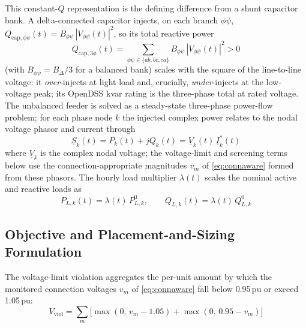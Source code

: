 \documentclass{ieeeaccess}
\newcommand{\SI}[2]{#1\,\ensuremath{\mathrm{#2}}}
\newcommand{\Vviol}{V_{\mathrm{viol}}}
\begin{document}
This constant-$Q$ representation is the defining difference from a shunt
capacitor bank. A delta-connected capacitor injects, on each branch $\phi\psi$,
$Q_{\mathrm{cap},\phi\psi}(t)=B_{\phi\psi}\,|V_{\phi\psi}(t)|^2$, so its total
reactive power
\begin{equation}
Q_{\mathrm{cap},3\phi}(t) = \!\!\sum_{\phi\psi\in\{ab,bc,ca\}}\!\! B_{\phi\psi}\,|V_{\phi\psi}(t)|^2 > 0
\label{eq:cap}
\end{equation}
(with $B_{\phi\psi}=B_\Delta/3$ for a balanced bank) scales with the square of the
line-to-line voltage: it \emph{over}-injects at light load and, crucially,
\emph{under}-injects at the low-voltage peak; its OpenDSS kvar rating is the
three-phase total at rated voltage. The unbalanced
feeder is solved as a steady-state three-phase power-flow problem; for each phase
node $k$ the injected complex power relates to the nodal voltage phasor and
current through
\begin{equation}
\underline S_k(t) = P_k(t) + jQ_k(t) = \underline V_k(t)\,\underline I_k^{*}(t)
\label{eq:powerflow}
\end{equation}
where $\underline V_k$ is the complex nodal voltage; the voltage-limit and
screening terms below use the connection-appropriate magnitudes $v_m$ of
\eqref{eq:connaware} formed from these phasors. The hourly load multiplier
$\lambda(t)$ scales the nominal active and reactive loads as
\begin{equation}
P_{L,k}(t) = \lambda(t)\,P^0_{L,k}, \qquad
Q_{L,k}(t) = \lambda(t)\,Q^0_{L,k}
\label{eq:loadscale}
\end{equation}

\subsection{Objective and Placement-and-Sizing Formulation}
The voltage-limit violation aggregates the per-unit amount by which the monitored
connection voltages $v_m$ of \eqref{eq:connaware} fall below \SI{0.95}{pu} or
exceed \SI{1.05}{pu}:
\begin{equation}
\Vviol = \sum_{m}\bigl[\max(0,\,v_m-1.05) + \max(0,\,0.95-v_m)\bigr]
\label{eq:viol}
\end{equation}
\end{document}
